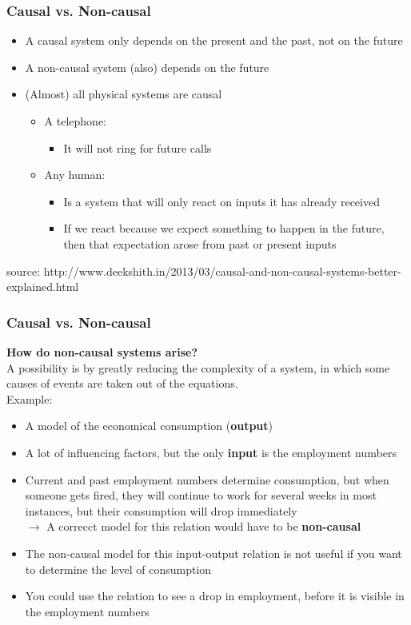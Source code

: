 \documentclass{beamer}
\begin{document}
\begin{frame}
\frametitle{Causal vs. Non-causal}
\begin{itemize}
\item \normalsize{A causal system only depends on the present and the past, not on the future}
\item \normalsize{A non-causal system (also) depends on the future}
\item \normalsize{(Almost) all physical systems are causal}
\begin{itemize}
\item \normalsize{A telephone:}
\begin{itemize}
\item \normalsize{It will not ring for future calls}
\end{itemize}
\item \normalsize{Any human:} 
\begin{itemize}
\item \normalsize{Is a system that will only react on inputs it has already received}
\item \normalsize{If we react because we expect something to happen in the future, then that expectation arose from past or present inputs}
\end{itemize}
\end{itemize}
\end{itemize}
\bigskip
\bigskip
\footnotesize{source: http://www.deekshith.in/2013/03/causal-and-non-causal-systems-better-explained.html}
\end{frame}


\begin{frame}
\frametitle{Causal vs. Non-causal}
\textbf{How do non-causal systems arise?}\\
\medskip
A possibility is by greatly reducing the complexity of a system, in which some causes of events are taken out of the equations.\\
Example:\\
\begin{itemize}
\item A model of the economical consumption (\textbf{output})
\item A lot of influencing factors, but the only \textbf{input} is the employment numbers
\item Current and past employment numbers determine consumption, but when someone gets fired, they will continue to work for several weeks in most instances, but their consumption will drop immediately\\
$\rightarrow$ A correcct model for this relation would have to be \textbf{non-causal}
\item The non-causal model for this input-output relation is not useful if you want to determine the level of consumption
\item You could use the relation to see a drop in employment, before it is visible in the employment numbers
\end{itemize}
\end{frame}
\end{document}
